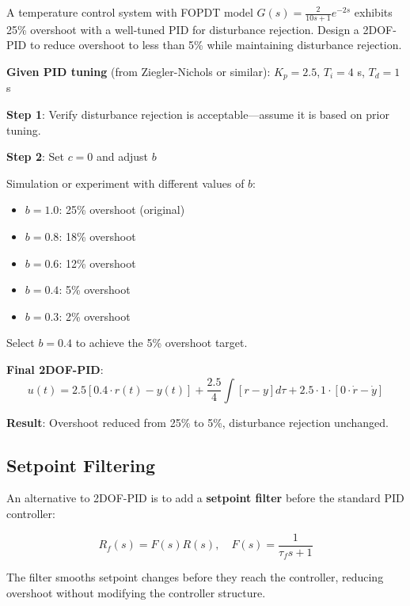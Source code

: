 \begin{example}
\label{ex:2dof_pid}
A temperature control system with FOPDT model $G(s) = \frac{2}{10s+1}e^{-2s}$ exhibits 25\% overshoot with a well-tuned PID for disturbance rejection. Design a 2DOF-PID to reduce overshoot to less than 5\% while maintaining disturbance rejection.

\textbf{Given PID tuning} (from Ziegler-Nichols or similar): $K_p = 2.5$, $T_i = 4$ s, $T_d = 1$ s

\textbf{Step 1}: Verify disturbance rejection is acceptable---assume it is based on prior tuning.

\textbf{Step 2}: Set $c = 0$ and adjust $b$

Simulation or experiment with different values of $b$:
\begin{itemize}
    \item $b = 1.0$: 25\% overshoot (original)
    \item $b = 0.8$: 18\% overshoot
    \item $b = 0.6$: 12\% overshoot
    \item $b = 0.4$: 5\% overshoot
    \item $b = 0.3$: 2\% overshoot
\end{itemize}

Select $b = 0.4$ to achieve the 5\% overshoot target.

\textbf{Final 2DOF-PID}:
\begin{equation}
u(t) = 2.5[0.4 \cdot r(t) - y(t)] + \frac{2.5}{4} \int [r - y] d\tau + 2.5 \cdot 1 \cdot [0 \cdot \dot{r} - \dot{y}]
\end{equation}

\textbf{Result}: Overshoot reduced from 25\% to 5\%, disturbance rejection unchanged.
\end{example}

\subsection{Setpoint Filtering}
\label{subsec:setpoint_filtering}

An alternative to 2DOF-PID is to add a \textbf{setpoint filter} before the standard PID controller:

\begin{equation}
R_f(s) = F(s) R(s), \quad F(s) = \frac{1}{\tau_f s + 1}
\label{eq:setpoint_filter}
\end{equation}

The filter smooths setpoint changes before they reach the controller, reducing overshoot without modifying the controller structure.

